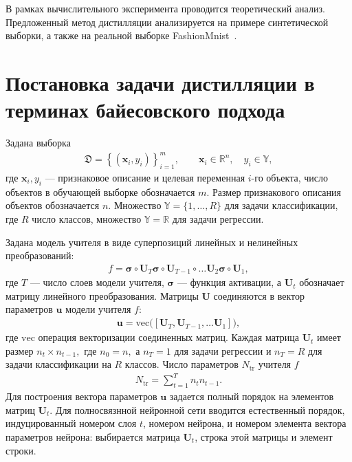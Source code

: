 В рамках вычислительного эксперимента проводится теоретический анализ. Предложенный метод дистилляции анализируется на примере синтетической выборки, а также на реальной выборке FashionMnist~\cite{fashionmnist}.

\section{Постановка задачи дистилляции в терминах байесовского подхода}
Задана выборка
\[
\label{ch:3:eq:st:1}
\begin{aligned}
\mathfrak{D} = \left\{\left(\mathbf{x}_i, y_i\right)\right\}_{i=1}^{m}, \qquad \mathbf{x}_i \in \mathbb{R}^{n}, \quad y_i \in \mathbb{Y},
\end{aligned}
\]
где $\mathbf{x}_i, y_i$ --- признаковое описание и целевая переменная $i$-го объекта, число объектов в обучающей выборке обозначается $m$. Размер признакового описания объектов обозначается $n$. Множество $\mathbb{Y}=\{1,\ldots,R\}$ для задачи классификации, где $R$ число классов, множество $\mathbb{Y}=\mathbb{R}$ для задачи регрессии.

Задана модель учителя в виде суперпозиций линейных и нелинейных преобразований:
\[
\label{ch:3:eq:st:2}
\begin{aligned}
f = \bm{\sigma} \circ \mathbf{U}_T \bm{\sigma} \circ \mathbf{U}_{T-1}\circ \ldots  \mathbf{U}_2\bm{\sigma} \circ \mathbf{U}_1,
\end{aligned}
\]
где $T$ --- число слоев модели учителя, $\bm{\sigma}$ --- функция активации, а $\mathbf{U}_t$ обозначает матрицу линейного преобразования. Матрицы $\mathbf{U}$ соединяются в вектор параметров $\mathbf{u}$ модели учителя $f$:
\[
\label{ch:3:eq:st:2.1}
\begin{aligned}
\mathbf{u} = \text{vec}\bigr(\left[\mathbf{U}_T, \mathbf{U}_{T-1}, \ldots \mathbf{U}_1\right]\bigr),
\end{aligned}
\]
где $\text{vec}$ операция векторизации соединенных матриц.
Каждая матрица $\mathbf{U}_t$ имеет размер $n_t\times n_{t-1},$ где $n_0=n,$ а  $n_T={1}$ для задачи регрессии и $n_T=R$ для задачи классификации на $R$ классов. Число параметров $N_{\text{tr}}$ учителя $f$
\[
\label{ch:3:eq:st:2.2}
\begin{aligned}
N_{\text{tr}} = \sum_{t=1}^{T}n_tn_{t-1}.
\end{aligned}
\]
Для построения вектора параметров $\mathbf{u}$ задается полный порядок на элементов матриц $\mathbf{U}_t$. Для полносвязнной нейронной сети вводится естественный порядок, индуцированный номером слоя $t$, номером нейрона, и номером элемента вектора параметров нейрона: выбирается матрица $\mathbf{U}_t$, строка этой матрицы и элемент строки.

